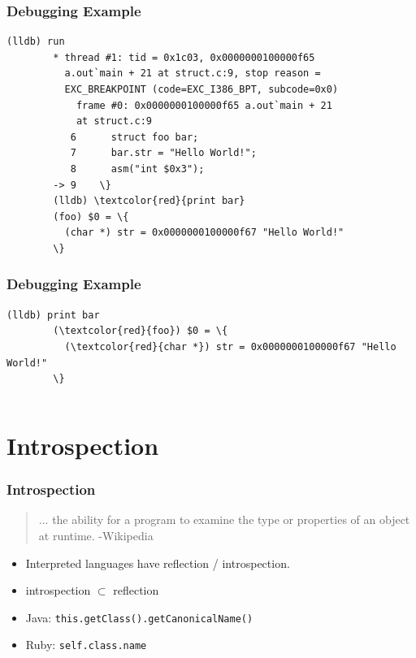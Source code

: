 \documentclass{beamer}
\begin{document}
\begin{frame}[fragile]
	\frametitle{Debugging Example}

	\begin{Verbatim}[commandchars=\\\{\}]
		(lldb) run
		* thread #1: tid = 0x1c03, 0x0000000100000f65
		  a.out`main + 21 at struct.c:9, stop reason =
		  EXC_BREAKPOINT (code=EXC_I386_BPT, subcode=0x0)
		    frame #0: 0x0000000100000f65 a.out`main + 21
		    at struct.c:9
		   6      struct foo bar;
		   7      bar.str = "Hello World!";
		   8      asm("int $0x3");
		-> 9    \}
		(lldb) \textcolor{red}{print bar}
		(foo) $0 = \{
		  (char *) str = 0x0000000100000f67 "Hello World!"
		\}
	\end{Verbatim}
\end{frame}

\begin{frame}[fragile]
	\frametitle{Debugging Example}

	\begin{Verbatim}[commandchars=\\\{\}]
		(lldb) print bar
		(\textcolor{red}{foo}) $0 = \{
		  (\textcolor{red}{char *}) str = 0x0000000100000f67 "Hello World!"
		\}
	\end{Verbatim}
	\pause
	\inputminted[tabsize=4,linenos]{c}{struct.c}
\end{frame}

\section{Introspection}

\begin{frame}[fragile]

	\frametitle{Introspection}
	\begin{quote}
		... the ability for a program to examine the type or properties of an object
		at runtime. -Wikipedia
	\end{quote}

	\begin{itemize}
		\item Interpreted languages have reflection / introspection.
		\item introspection $\subset$ reflection

		\item {
			\lstset{language=Java}
			Java: \lstinline!this.getClass().getCanonicalName()!
		}

		\item {
			\lstset{language=Ruby}
			Ruby: \lstinline!self.class.name!
		}
	\end{itemize}
\end{frame}
\end{document}
